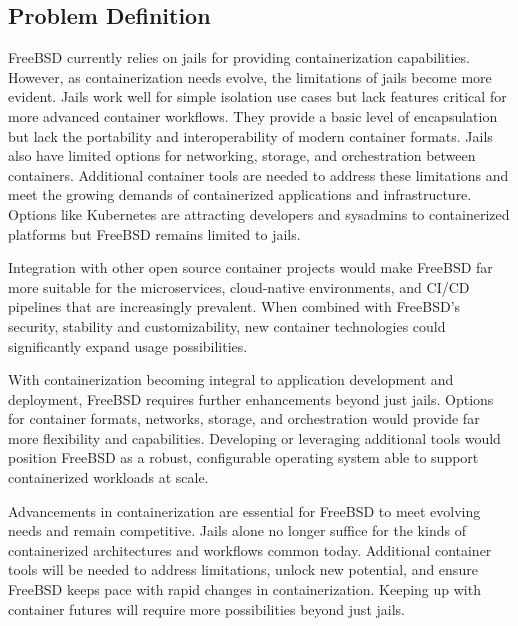 \documentclass[12pt, dvipsnames, a4paper]{article}
\begin{document}
\subsection{Problem Definition}
FreeBSD currently relies on jails for providing containerization capabilities. However, as containerization needs evolve, the limitations of jails become more evident.
Jails work well for simple isolation use cases but lack features critical for more advanced container workflows. They provide a basic level of encapsulation but lack the portability and interoperability of modern container formats. Jails also have limited options for networking, storage, and orchestration between containers.
Additional container tools are needed to address these limitations and meet the growing demands of containerized applications and infrastructure. Options like Kubernetes are attracting developers and sysadmins to containerized platforms but FreeBSD remains limited to jails.

Integration with other open source container projects would make FreeBSD far more suitable for the microservices, cloud-native environments, and CI/CD pipelines that are increasingly prevalent. When combined with FreeBSD's security, stability and customizability, new container technologies could significantly expand usage possibilities.

With containerization becoming integral to application development and deployment, FreeBSD requires further enhancements beyond just jails. Options for container formats, networks, storage, and orchestration would provide far more flexibility and capabilities. Developing or leveraging additional tools would position FreeBSD as a robust, configurable operating system able to support containerized workloads at scale.

Advancements in containerization are essential for FreeBSD to meet evolving needs and remain competitive. Jails alone no longer suffice for the kinds of containerized architectures and workflows common today. Additional container tools will be needed to address limitations, unlock new potential, and ensure FreeBSD keeps pace with rapid changes in containerization. Keeping up with container futures will require more possibilities beyond just jails.
\end{document}
